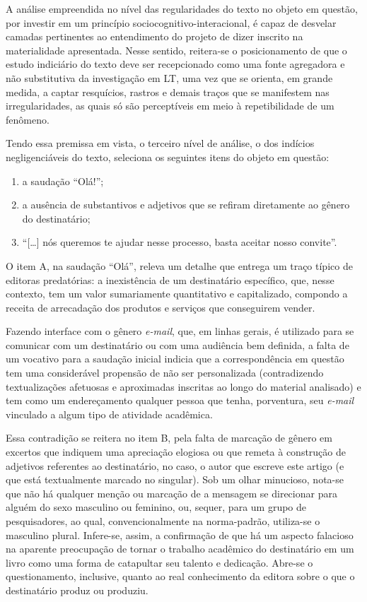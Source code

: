 \documentclass[portuguese]{textolivre}
\begin{document}
\begin{enumerate}
A análise empreendida no nível das regularidades do texto no objeto em questão, por investir em um princípio sociocognitivo-interacional, é capaz de desvelar camadas pertinentes ao entendimento do projeto de dizer inscrito na materialidade apresentada. Nesse sentido, reitera-se o posicionamento de que o estudo indiciário do texto deve ser recepcionado como uma fonte agregadora e não substitutiva da investigação em LT, uma vez que se orienta, em grande medida, a captar resquícios, rastros e demais traços que se manifestem nas irregularidades, as quais só são perceptíveis em meio à repetibilidade de um fenômeno.

Tendo essa premissa em vista, o terceiro nível de análise, o dos indícios negligenciáveis do texto, seleciona os seguintes itens do objeto em questão:

\begin{enumerate}
    \item a saudação “Olá!”;
    \item a ausência de substantivos e adjetivos que se refiram diretamente ao gênero do destinatário;
    \item “[…] nós queremos te ajudar nesse processo, basta aceitar nosso convite”.
\end{enumerate}

O item A, na saudação “Olá”, releva um detalhe que entrega um traço típico de editoras predatórias: a inexistência de um destinatário específico, que, nesse contexto, tem um valor sumariamente quantitativo e capitalizado, compondo a receita de arrecadação dos produtos e serviços que conseguirem vender.

Fazendo interface com o gênero \textit{e-mail}, que, em linhas gerais, é utilizado para se comunicar com um destinatário ou com uma audiência bem definida, a falta de um vocativo para a saudação inicial indicia que a correspondência em questão tem uma considerável propensão de não ser personalizada (contradizendo textualizações afetuosas e aproximadas inscritas ao longo do material analisado) e tem como um endereçamento qualquer pessoa que tenha, porventura, seu \textit{e-mail} vinculado a algum tipo de atividade acadêmica.

Essa contradição se reitera no item B, pela falta de marcação de gênero em excertos que indiquem uma apreciação elogiosa ou que remeta à construção de adjetivos referentes ao destinatário, no caso, o autor que escreve este artigo (e que está textualmente marcado no singular). Sob um olhar minucioso, nota-se que não há qualquer menção ou marcação de a mensagem se direcionar para alguém do sexo masculino ou feminino, ou, sequer, para um grupo de pesquisadores, ao qual, convencionalmente na norma-padrão, utiliza-se o masculino plural. Infere-se, assim, a confirmação de que há um aspecto falacioso na aparente preocupação de tornar o trabalho acadêmico do destinatário em um livro como uma forma de catapultar seu talento e dedicação. Abre-se o questionamento, inclusive, quanto ao real conhecimento da editora sobre o que o destinatário produz ou produziu.


\end{enumerate}
\end{document}
